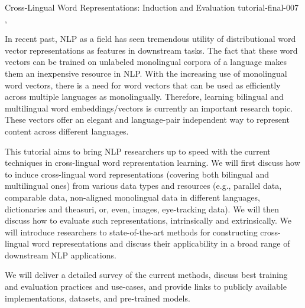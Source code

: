 \begin{tutorial}{Cross-Lingual Word Representations: Induction and Evaluation}
  {tutorial-final-007}
  {\daydateyear, \tutorialafternoontime}
  {\TutLocG}

In recent past, NLP as a field has seen tremendous utility of distributional word vector representations as features in downstream tasks. The fact that these word vectors can be trained on unlabeled monolingual corpora of a language makes them an inexpensive resource in NLP. With the increasing use of monolingual word vectors, there is a need for word vectors that can be used as efficiently across multiple languages as monolingually. Therefore, learning bilingual and multilingual word embeddings/vectors is currently an important research topic. These vectors offer an elegant and language-pair independent way to represent content across different languages.

This tutorial aims to bring NLP researchers up to speed with the current techniques in cross-lingual word representation learning. We will first discuss how to induce cross-lingual word representations (covering both bilingual and multilingual ones) from various data types and resources (e.g., parallel data, comparable data, non-aligned monolingual data in different languages, dictionaries and theasuri, or, even, images, eye-tracking data). We will then discuss how to evaluate such representations, intrinsically and extrinsically. We will introduce researchers to state-of-the-art methods for constructing cross-lingual word representations and discuss their applicability in a broad range of downstream NLP applications.

We will deliver a detailed survey of the current methods, discuss best training and evaluation practices and use-cases, and provide links to publicly available implementations, datasets, and pre-trained models.

\end{tutorial}
